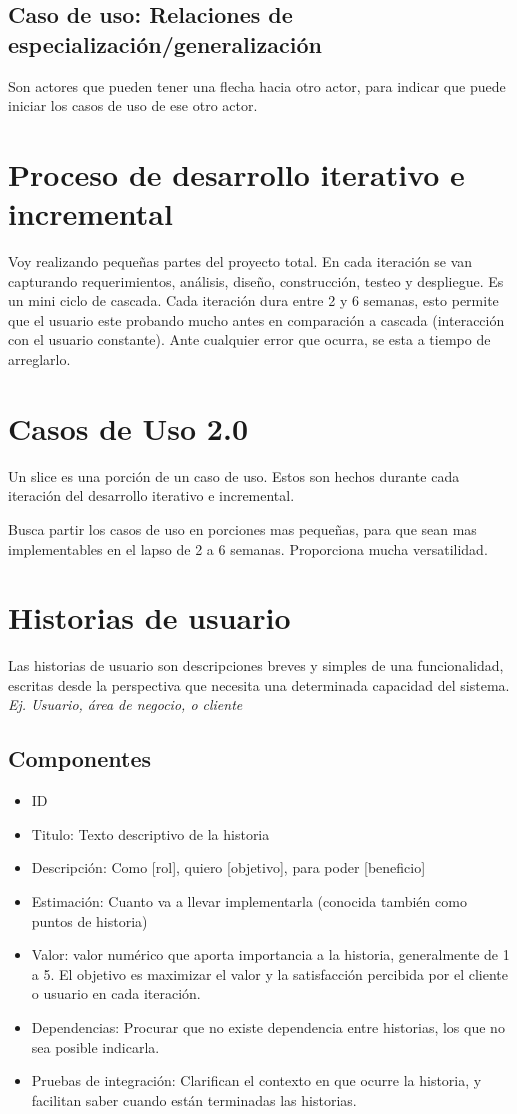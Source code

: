 \documentclass[titlepage,a4paper]{article}
\begin{document}
\subsection*{Caso de uso: Relaciones de especialización/generalización}
Son actores que pueden tener una flecha hacia otro actor, para indicar que puede iniciar los casos de uso de ese otro actor.

\section{Proceso de desarrollo iterativo e incremental}
Voy realizando pequeñas partes del proyecto total. En cada iteración se van capturando requerimientos, análisis, diseño, construcción, testeo y despliegue. Es un mini ciclo de cascada. Cada iteración dura entre 2 y 6 semanas, esto permite que el usuario este probando mucho antes en comparación a cascada (interacción con el usuario constante). Ante cualquier error que ocurra, se esta a tiempo de arreglarlo.

\section{Casos de Uso 2.0}
Un slice es una porción de un caso de uso. Estos son hechos durante cada iteración del desarrollo iterativo e incremental.

Busca partir los casos de uso en porciones mas pequeñas, para que sean mas implementables en el lapso de 2 a 6 semanas. Proporciona mucha versatilidad.

\section{Historias de usuario}
Las historias de usuario son descripciones breves y simples de una funcionalidad, escritas desde la perspectiva que necesita una determinada capacidad del sistema. \textit{Ej. Usuario, área de negocio, o cliente}

\subsection*{Componentes}
\begin{itemize}
    \item ID
    \item Titulo: Texto descriptivo de la historia
    \item Descripción: Como [rol], quiero [objetivo], para poder [beneficio]
    \item Estimación: Cuanto va a llevar implementarla (conocida también como puntos de historia)
    \item Valor: valor numérico que aporta importancia a la historia, generalmente de 1 a 5. El objetivo es maximizar el valor y la satisfacción percibida por el cliente o usuario en cada iteración.
    \item Dependencias: Procurar que no existe dependencia entre historias, los que no sea posible indicarla.
    \item Pruebas de integración: Clarifican el contexto en que ocurre la historia, y facilitan saber cuando están terminadas las historias.
\end{itemize}
\end{document}
